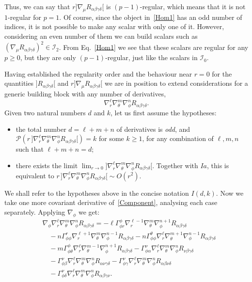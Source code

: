 \documentclass[aps,prd,a4paper,twocolumn,showpacs,showkeys,preprintnumbers,amsmath,amssymb,nofootinbib]{revtex4-2}
\numberwithin{equation}{section}
\def\beq{\begin{equation}}
\def\eeq{\end{equation}}
\def\al{\alpha}
\def\be{\beta}
\def\ga{\gamma}
\def\Ga{\Gamma}
\def\de{\delta}
\def\th{\theta}
\def\na{\nabla}
\begin{document}
Thus, we can say that $r{]\na_\mu R_{\al\be\ga\de}[}$ is $(p-1)$-regular, which means that it is not $1$-regular for $p=1$. 
Of course, since the object in~\eqref{Hom1} has an odd number of indices, it is not possible to make any scalar with only one of it. However, considering an even number of them we can build scalars such as $(\na_\mu R_{\al\be\ga\de})^{2}\in \mathscr{I}_{2}$. 
From Eq.~\eqref{Hom1} we see that these scalars are regular for any $p \geqslant 0$, but they are only $(p-1)$-regular, just like the scalars in $\mathscr{I}_{0}$.

Having established the regularity order and the behaviour near $r=0$ for the quantities ${]R_{\al\be\ga\de}[}$ and $r{]\na_\mu R_{\al\be\ga\de}[}$ we are in position to extend considerations for a generic building block with any number of derivatives,
\beq \label{Component}
\na_r^{\ell} \na_\th^m \na_\phi^n R_{\al\be\ga\de}.
\eeq
%
Given two natural numbers $d$ and $k$, let us first assume the hypotheses:
\begin{itemize}
\item[$Ia$.] the total number $d=\ell+m+n$ of derivatives is \textit{odd}, and  $\mathscr{P}(r \, {]\na_r^{\ell} \na_\th^m \na_\phi^n R_{\al\be\ga\de}[})=k$ for some $k \geqslant 1$, for any combination of $\ell,m,n$ such that $\ell+m+n=d$;
\item[$Ib$.] there exists the limit $\lim_{r\to 0} {]\na_r^{\ell} \na_\th^m \na_\phi^n R_{\al\be\ga\de}[}$. Together with $Ia$, this is equivalent to $r \, {]\na_r^{\ell} \na_\th^m \na_\phi^n R_{\al\be\ga\de}[} \sim O(r^2)$.
\end{itemize}
We shall refer to the hypotheses above in the concise notation $I(d,k)$.
Now we take one more covariant derivative of~\eqref{Component}, analysing each case separately. Applying $\na_\phi$ we get:
%
\begin{equation} \label{DerPhi}
\begin{split}
& \na_\phi \na_r^\ell \na_\th^m \na_\phi^n R_{\al\be\ga\de} =  - \ell \Ga^\phi_{\phi r} \na_r^{\ell-1} \na_\th^m \na_\phi^{n+1} R_{\al\be\ga\de}  
\\ & \quad - n \Ga^r_{\phi\phi} \na_r^{\ell+1} \na_\th^m \na_\phi^{n-1} R_{\al\be\ga\de} - n \Ga^\th_{\phi\phi} \na_r^{\ell} \na_\th^{m+1} \na_\phi^{n-1} R_{\al\be\ga\de} 
\\
& \quad - m \Ga^\phi_{\phi\th} \na_r^{\ell} \na_\th^{m-1} \na_\phi^{n+1} R_{\al\be\ga\de} 
 - \Ga^\nu_{\phi\al} \na_r^\ell \na_\th^m \na_\phi^n R_{\nu\be\ga\de} 
 \\
 &\quad - \Ga^\nu_{\phi\be} \na_r^\ell \na_\th^m \na_\phi^n R_{\al\nu\ga\de} 
 - \Ga^\nu_{\phi\ga} \na_r^\ell \na_\th^m \na_\phi^n R_{\al\be\nu\de} 
 \\
 &\quad - \Ga^\nu_{\phi\de} \na_r^\ell \na_\th^m \na_\phi^n R_{\al\be\ga\nu}  .
\end{split}
\end{equation} 
\end{document}
